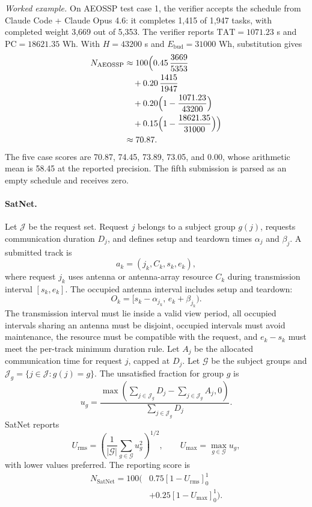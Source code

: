 \documentclass[11pt]{article}
\begin{document}
\emph{Worked example.} On AEOSSP test case 1, the verifier accepts the schedule from Claude Code + Claude Opus 4.6: it completes 1,415 of 1,947 tasks, with completed weight 3,669 out of 5,353. The verifier reports \(\mathrm{TAT}=1071.23\) s and \(\mathrm{PC}=18621.35\) Wh. With \(H=43200\) s and \(E_{\mathrm{bud}}=31000\) Wh, substitution gives
\[
\begin{aligned}
N_{\mathrm{AEOSSP}}
&\approx 100\Bigl(0.45\,\frac{3669}{5353}\\
&\quad+0.20\,\frac{1415}{1947}\\
&\quad+0.20\Bigl(1-\frac{1071.23}{43200}\Bigr)\\
&\quad+0.15\Bigl(1-\frac{18621.35}{31000}\Bigr)\Bigr)\\
&\approx 70.87.
\end{aligned}
\]
The five case scores are 70.87, 74.45, 73.89, 73.05, and 0.00, whose arithmetic mean is 58.45 at the reported precision. The fifth submission is parsed as an empty schedule and receives zero.

\paragraph{SatNet.} Let \(\mathcal{J}\) be the request set. Request \(j\) belongs to a subject group \(g(j)\), requests communication duration \(D_j\), and defines setup and teardown times \(\alpha_j\) and \(\beta_j\). A submitted track is
\[
  a_k=(j_k,C_k,s_k,e_k),
\]
where request \(j_k\) uses antenna or antenna-array resource \(C_k\) during transmission interval \([s_k,e_k]\). The occupied antenna interval includes setup and teardown:
\[
  O_k=[s_k-\alpha_{j_k},\,e_k+\beta_{j_k}).
\]
The transmission interval must lie inside a valid view period, all occupied intervals sharing an antenna must be disjoint, occupied intervals must avoid maintenance, the resource must be compatible with the request, and \(e_k-s_k\) must meet the per-track minimum duration rule. Let \(A_j\) be the allocated communication time for request \(j\), capped at \(D_j\). Let \(\mathcal{G}\) be the subject groups and \(\mathcal{J}_g=\{j\in\mathcal{J}:g(j)=g\}\). The unsatisfied fraction for group \(g\) is
\[
  u_g=\frac{\max\left(\sum_{j\in\mathcal{J}_g}D_j-\sum_{j\in\mathcal{J}_g}A_j,0\right)}{\sum_{j\in\mathcal{J}_g}D_j}.
\]
SatNet reports
\[
  U_{\mathrm{rms}}=\left(\frac{1}{|\mathcal{G}|}\sum_{g\in\mathcal{G}}u_g^2\right)^{1/2},\qquad
  U_{\max}=\max_{g\in\mathcal{G}}u_g,
\]
with lower values preferred. The reporting score is
\[
  \begin{aligned}
  N_{\mathrm{SatNet}}=100(&0.75[1-U_{\mathrm{rms}}]_0^1\\
  &+0.25[1-U_{\max}]_0^1).
  \end{aligned}
\]
\end{document}

